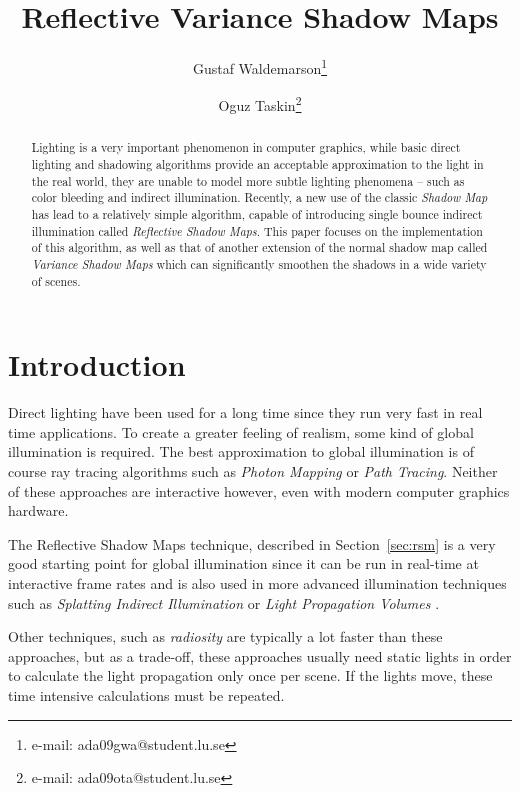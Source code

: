 \documentclass{acmsiggraph}               %
\title{Reflective Variance Shadow Maps}
\author{Gustaf Waldemarson\thanks{e-mail: ada09gwa@student.lu.se} \and Oguz Taskin\thanks{e-mail: ada09ota@student.lu.se}}
\affiliation{Faculty of Engineering (LTH), Lund University \\ Sweden}
\begin{document}
\ifpdf
\else
\fi


\maketitle

\begin{abstract}
Lighting is a very important phenomenon in computer graphics, while basic direct lighting and shadowing algorithms provide an acceptable approximation to the light in the real world, they are unable to model more subtle lighting phenomena -- such as color bleeding and indirect illumination. Recently, a new use of the classic \emph{Shadow Map} has lead to a relatively simple algorithm, capable of introducing single bounce indirect illumination called \emph{Reflective Shadow Maps}. This paper focuses on the implementation of this algorithm, as well as that of another extension of the normal shadow map called \emph{Variance Shadow Maps} which can significantly smoothen the shadows in a wide variety of scenes.
\end{abstract}
\keywordlist

\section{Introduction}
Direct lighting have been used for a long time since they run very fast in real time applications. To create a greater feeling of realism, some kind of global illumination is required. The best approximation to global illumination is of course ray tracing algorithms such as \emph{Photon Mapping} or \emph{Path Tracing}. Neither of these approaches are interactive however, even with modern computer graphics hardware.

The Reflective Shadow Maps technique, described in Section~\ref{sec:rsm} is a very good starting point for global illumination since it can be run in real-time at interactive frame rates and is also used in more advanced illumination techniques such as \emph{Splatting Indirect Illumination} \cite{SII06} or \emph{Light Propagation Volumes} \cite{LPV09}.

Other techniques, such as \emph{radiosity}
are typically a lot faster than these approaches, but as a trade-off, these approaches usually need static lights in order to calculate the light propagation only once per scene. If the lights move, these time intensive calculations must be repeated.
\end{document}
